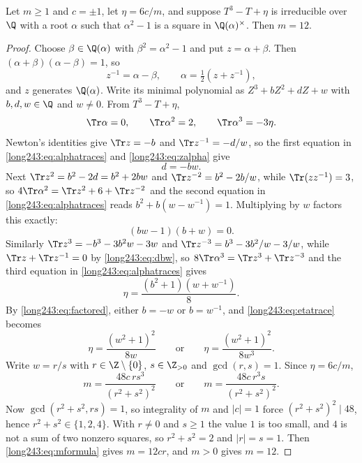 \begin{lemma}\label{long243:res:scaletwelve}
Let $m\ge1$ and $c=\pm1$, let $\eta=6c/m$, and suppose $T^3-T+\eta$ is
irreducible over $\Q$ with a root $\alpha$ such that $\alpha^2-1$ is a square
in $\Q(\alpha)^\times$.  Then $m=12$.
\end{lemma}

\begin{proof}
Choose $\beta\in\Q(\alpha)$ with $\beta^2=\alpha^2-1$ and put $z=\alpha+\beta$.
Then $(\alpha+\beta)(\alpha-\beta)=1$, so
\begin{equation}\label{long243:eq:zalpha}
 z^{-1}=\alpha-\beta,\qquad \alpha=\tfrac12(z+z^{-1}),
\end{equation}
and $z$ generates $\Q(\alpha)$.  Write its minimal polynomial as
$Z^3+bZ^2+dZ+w$ with $b,d,w\in\Q$ and $w\ne0$.  From $T^3-T+\eta$,
\begin{equation}\label{long243:eq:alphatraces}
 \Tr\alpha=0,\qquad \Tr\alpha^2=2,\qquad \Tr\alpha^3=-3\eta .
\end{equation}
Newton's identities give $\Tr z=-b$ and $\Tr z^{-1}=-d/w$, so the first
equation in \eqref{long243:eq:alphatraces} and \eqref{long243:eq:zalpha} give
\begin{equation}\label{long243:eq:dbw}
 d=-bw .
\end{equation}
Next $\Tr z^2=b^2-2d=b^2+2bw$ and $\Tr z^{-2}=b^2-2b/w$, while
$\Tr(zz^{-1})=3$, so $4\Tr\alpha^2=\Tr z^2+6+\Tr z^{-2}$ and the second
equation in \eqref{long243:eq:alphatraces} reads $b^2+b(w-w^{-1})=1$.  Multiplying by
$w$ factors this exactly:
\begin{equation}\label{long243:eq:factored}
 (bw-1)(b+w)=0 .
\end{equation}
Similarly $\Tr z^3=-b^3-3b^2w-3w$ and $\Tr z^{-3}=b^3-3b^2/w-3/w$, while
$\Tr z+\Tr z^{-1}=0$ by \eqref{long243:eq:dbw}, so
$8\Tr\alpha^3=\Tr z^3+\Tr z^{-3}$ and the third equation in
\eqref{long243:eq:alphatraces} gives
\begin{equation}\label{long243:eq:etatrace}
 \eta=\frac{(b^2+1)(w+w^{-1})}8 .
\end{equation}
By \eqref{long243:eq:factored}, either $b=-w$ or $b=w^{-1}$, and \eqref{long243:eq:etatrace}
becomes
\[
 \eta=\frac{(w^2+1)^2}{8w}
 \qquad\text{or}\qquad
 \eta=\frac{(w^2+1)^2}{8w^3}.
\]
Write $w=r/s$ with $r\in\Z\mathbin{\backslash}\{0\}$, $s\in\Z_{>0}$ and $\gcd(r,s)=1$.
Since $\eta=6c/m$,
\begin{equation}\label{long243:eq:mformula}
 m=\frac{48c\,rs^3}{(r^2+s^2)^2}
 \qquad\text{or}\qquad
 m=\frac{48c\,r^3s}{(r^2+s^2)^2}.
\end{equation}
Now $\gcd(r^2+s^2,rs)=1$, so integrality of $m$ and $|c|=1$ force
$(r^2+s^2)^2\mid48$, hence $r^2+s^2\in\{1,2,4\}$.  With $r\ne0$ and $s\ge1$ the
value $1$ is too small, and $4$ is not a sum of two nonzero squares, so
$r^2+s^2=2$ and $|r|=s=1$.  Then \eqref{long243:eq:mformula} gives $m=12cr$, and
$m>0$ gives $m=12$.
\end{proof}

